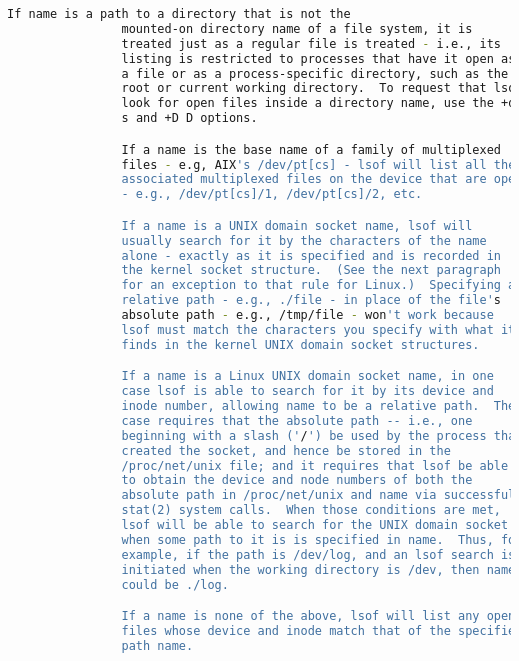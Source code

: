 {{\begin{lstlisting}[language=bash]
                If name is a path to a directory that is not the
                mounted-on directory name of a file system, it is
                treated just as a regular file is treated - i.e., its
                listing is restricted to processes that have it open as
                a file or as a process-specific directory, such as the
                root or current working directory.  To request that lsof
                look for open files inside a directory name, use the +d
                s and +D D options.

                If a name is the base name of a family of multiplexed
                files - e.g, AIX's /dev/pt[cs] - lsof will list all the
                associated multiplexed files on the device that are open
                - e.g., /dev/pt[cs]/1, /dev/pt[cs]/2, etc.

                If a name is a UNIX domain socket name, lsof will
                usually search for it by the characters of the name
                alone - exactly as it is specified and is recorded in
                the kernel socket structure.  (See the next paragraph
                for an exception to that rule for Linux.)  Specifying a
                relative path - e.g., ./file - in place of the file's
                absolute path - e.g., /tmp/file - won't work because
                lsof must match the characters you specify with what it
                finds in the kernel UNIX domain socket structures.

                If a name is a Linux UNIX domain socket name, in one
                case lsof is able to search for it by its device and
                inode number, allowing name to be a relative path.  The
                case requires that the absolute path -- i.e., one
                beginning with a slash ('/') be used by the process that
                created the socket, and hence be stored in the
                /proc/net/unix file; and it requires that lsof be able
                to obtain the device and node numbers of both the
                absolute path in /proc/net/unix and name via successful
                stat(2) system calls.  When those conditions are met,
                lsof will be able to search for the UNIX domain socket
                when some path to it is is specified in name.  Thus, for
                example, if the path is /dev/log, and an lsof search is
                initiated when the working directory is /dev, then name
                could be ./log.

                If a name is none of the above, lsof will list any open
                files whose device and inode match that of the specified
                path name.


\end{lstlisting}}}
